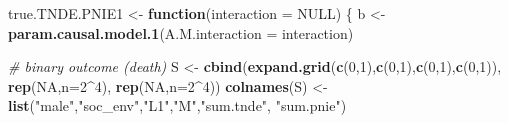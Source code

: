 \documentclass[
]{book}
\newenvironment{Shaded}{\begin{snugshade}}{\end{snugshade}}
\newcommand{\AttributeTok}[1]{\textcolor[rgb]{0.13,0.29,0.53}{#1}}
\newcommand{\CommentTok}[1]{\textcolor[rgb]{0.56,0.35,0.01}{\textit{#1}}}
\newcommand{\ConstantTok}[1]{\textcolor[rgb]{0.56,0.35,0.01}{#1}}
\newcommand{\ControlFlowTok}[1]{\textcolor[rgb]{0.13,0.29,0.53}{\textbf{#1}}}
\newcommand{\DecValTok}[1]{\textcolor[rgb]{0.00,0.00,0.81}{#1}}
\newcommand{\FunctionTok}[1]{\textcolor[rgb]{0.13,0.29,0.53}{\textbf{#1}}}
\newcommand{\NormalTok}[1]{#1}
\newcommand{\OtherTok}[1]{\textcolor[rgb]{0.56,0.35,0.01}{#1}}
\newcommand{\SpecialCharTok}[1]{\textcolor[rgb]{0.81,0.36,0.00}{\textbf{#1}}}
\newcommand{\StringTok}[1]{\textcolor[rgb]{0.31,0.60,0.02}{#1}}
\begin{document}
\begin{Shaded}
\begin{Highlighting}[]
\NormalTok{true.TNDE.PNIE1 }\OtherTok{\textless{}{-}} \ControlFlowTok{function}\NormalTok{(}\AttributeTok{interaction =} \ConstantTok{NULL}\NormalTok{) \{}
\NormalTok{  b }\OtherTok{\textless{}{-}} \FunctionTok{param.causal.model.1}\NormalTok{(}\AttributeTok{A.M.interaction =}\NormalTok{ interaction)}
  
  \CommentTok{\# binary outcome (death)}
\NormalTok{  S }\OtherTok{\textless{}{-}} \FunctionTok{cbind}\NormalTok{(}\FunctionTok{expand.grid}\NormalTok{(}\FunctionTok{c}\NormalTok{(}\DecValTok{0}\NormalTok{,}\DecValTok{1}\NormalTok{),}\FunctionTok{c}\NormalTok{(}\DecValTok{0}\NormalTok{,}\DecValTok{1}\NormalTok{),}\FunctionTok{c}\NormalTok{(}\DecValTok{0}\NormalTok{,}\DecValTok{1}\NormalTok{),}\FunctionTok{c}\NormalTok{(}\DecValTok{0}\NormalTok{,}\DecValTok{1}\NormalTok{)), }\FunctionTok{rep}\NormalTok{(}\ConstantTok{NA}\NormalTok{,}\AttributeTok{n=}\DecValTok{2}\SpecialCharTok{\^{}}\DecValTok{4}\NormalTok{), }\FunctionTok{rep}\NormalTok{(}\ConstantTok{NA}\NormalTok{,}\AttributeTok{n=}\DecValTok{2}\SpecialCharTok{\^{}}\DecValTok{4}\NormalTok{))}
  \FunctionTok{colnames}\NormalTok{(S) }\OtherTok{\textless{}{-}} \FunctionTok{list}\NormalTok{(}\StringTok{"male"}\NormalTok{,}\StringTok{"soc\_env"}\NormalTok{,}\StringTok{"L1"}\NormalTok{,}\StringTok{"M"}\NormalTok{,}\StringTok{"sum.tnde"}\NormalTok{, }\StringTok{"sum.pnie"}\NormalTok{)}
  

\end{Highlighting}
\end{Shaded}
\end{document}
